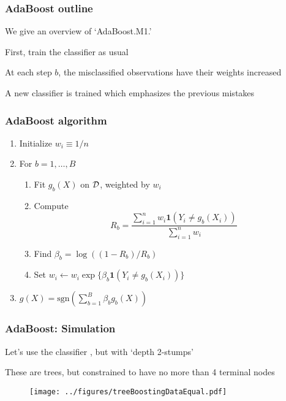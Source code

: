 \documentclass[12pt]{beamer}
\begin{document}

\begin{frame}[fragile]
\frametitle{AdaBoost outline}
We give an overview of `AdaBoost.M1.' 


\vsp
First, train the classifier as usual


\vsp
At each step $b$, the misclassified observations have their weights increased


\vsp
A new classifier is trained which emphasizes the previous mistakes
\end{frame}

\begin{frame}[fragile]
\frametitle{AdaBoost algorithm}
\begin{enumerate}
\item Initialize $w_i \equiv 1/n$
\item For $b = 1,\ldots,B$
\begin{enumerate}
\item Fit $g_b(X)$ on $\mathcal{D}$, weighted by $w_i$
\item Compute
\[
R_b = \frac{\sum_{i=1}^n w_i \mathbf{1}(Y_i \neq g_b(X_i))}{\sum_{i=1}^n w_i}
\]

\item Find $\beta_b = \log((1-R_b)/R_b)$
\item Set $w_i \leftarrow w_i\exp\{\beta_b \mathbf{1}(Y_i \neq g_b(X_i))\}$
\end{enumerate}
\item {} $g(X) = \textrm{sgn}\left(\sum_{b=1}^B \beta_b g_b(X)\right)$
\end{enumerate}
\end{frame}



\begin{frame}[fragile]
\frametitle{AdaBoost: Simulation}
Let's use the classifier , but with `depth 2-stumps'

\vsp
These are trees, but constrained to have no more than 4 terminal nodes

\begin{figure}
\texttt{[image: ../figures/treeBoostingDataEqual.pdf]}
\end{figure}
\end{frame}
\end{document}
